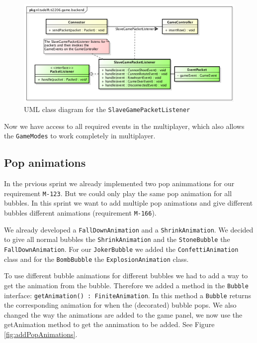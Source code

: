 \documentclass[a4paper]{article}
\begin{document}
\begin{figure}[H]
	\centering
	\includegraphics[scale=0.5]{SlaveGamePacketListener.png}
    \caption{UML class diagram for the \texttt{SlaveGamePacketListener} }
    \label{fig:slavegamepacketlistener}
\end{figure}

Now we have access to all required events in the multiplayer, which also allows the \texttt{GameModes} to work completely in multiplayer.


\subsection{Pop animations}
In the prvious sprint we already implemented two pop animmations for our requirement \texttt{M-123}. But we could only play the same pop animation for all bubbles. In this sprint we want to add multiple pop animations and give different bubbles different animations (requirement \texttt{M-166}).

We already developed a \texttt{FallDownAnimation} and a \texttt{ShrinkAnimation}. We decided to give all normal bubbles the \texttt{ShrinkAnimation} and the \texttt{StoneBubble} the \texttt{FallDownAnimation}. For our \texttt{JokerBubble} we added the \texttt{ConfettiAnimation} class and for the \texttt{BombBubble} the \texttt{ExplosionAnimation} class.

To use different bubble animations for different bubbles we had to add a way to get the animation from the bubble. Therefore we added a method in the \texttt{Bubble} interface: \texttt{getAnimation() : FiniteAnimation}. In this method a \texttt{Bubble} returns the corresponding animation for when the (decorated) bubble pops. We also changed the way the animations are added to the game panel, we now use the getAnimation method to get the annimation to be added. See Figure \ref{fig:addPopAnimations}.
\end{document}
